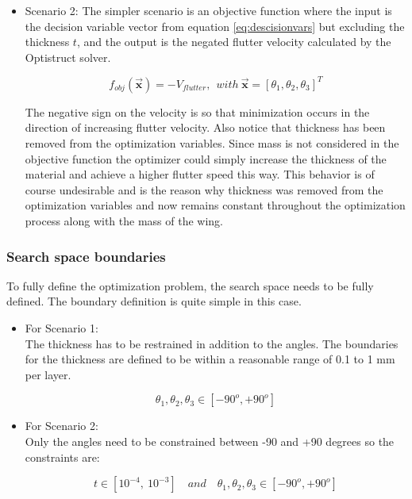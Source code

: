 \begin{itemize}
\item
  Scenario 2: The simpler scenario is an objective function where the
  input is the decision variable vector from equation \eqref{eq:descisionvars} but
  excluding the thickness \(t\), and the output is the negated flutter
  velocity calculated by the Optistruct solver.


\begin{equation}
f_{obj}\left( \vec{\mathbf{x}} \right) = - V_{flutter},\ \ with\ \vec{\mathbf{x}}\mathbf{=}\left\lbrack \theta_{1},\theta_{2},\theta_{3} \right\rbrack^{T}
\label{eq:objpowell2}
\end{equation}

The negative sign on the velocity is so that minimization occurs in the direction of increasing flutter velocity. Also notice that thickness has been removed from the optimization variables. Since mass is not considered in the objective function the optimizer could simply increase the thickness of the material and achieve a higher flutter speed this way. This behavior is of course undesirable and is the reason why thickness was removed from the optimization variables and now remains constant throughout the optimization process along with the mass of the wing.
\end{itemize}

\subsubsection{Search space boundaries}

To fully define the optimization problem, the search space needs to be fully defined. The boundary definition is quite simple in this case.

\begin{itemize}
\item
  For Scenario 1:\\
  The thickness has to be restrained in addition to the angles. The boundaries for the thickness are defined to be within a reasonable range
  of 0.1 to 1 mm per layer.

\begin{equation}
\theta_{1},\theta_{2},\theta_{3} \in [ - 90^{o}, + 90^{o} ]
\end{equation}


\item
  For Scenario 2:\\
  Only the angles need to be constrained between -90 and +90 degrees so
  the constraints are:



\begin{equation}
t \in [ 10^{- 4},\ 10^{- 3} ]\quad and \quad \theta_{1},\theta_{2},\theta_{3} \in [ - 90^{o}, + 90^{o} ]
\end{equation}
\end{itemize}



